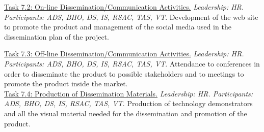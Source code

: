\begin{table}[H]
\begin{tabular}
{{		\underline{Task 7.2: On-line Dissemination/Communication Activities.} \textit{Leadership: HR. Participants: ADS, BHO, DS, IS, RSAC, TAS, VT}. Development of the web site to promote the product and management of the social media used in the dissemination plan of the project.

		\underline{Task 7.3: Off-line Dissemination/Communication Activities.} \textit{Leadership: HR. Participants: ADS, BHO, DS, IS, RSAC, TAS, VT}. Attendance to conferences in order to disseminate the product to possible stakeholders and to meetings to promote the product inside the market.\\

		\underline{Task 7.4: Production of Dissemination Materials.} \textit{Leadership: HR. Participants: ADS, BHO, DS, IS, RSAC, TAS, VT}. Production of technology demonstrators and all the visual material needed for the dissemination and promotion of the product. \\

		
		 }}\\
		 \hline 
		 
		 \\
		 
		 \hline 
		 
		\end{tabular}
		
		\caption{WP7 description}
		
\end{table}